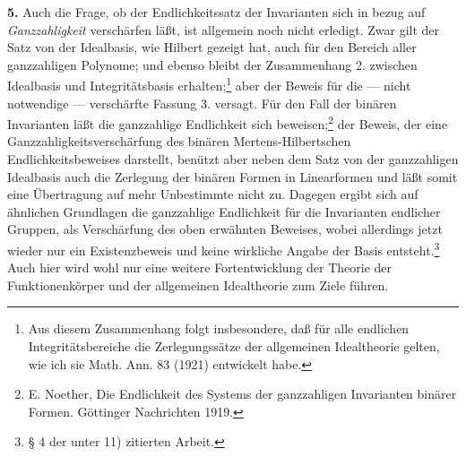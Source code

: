\documentclass[11pt]{article}
\begin{document}
\textbf{5.} Auch die Frage, ob der Endlichkeitssatz der Invarianten sich in bezug auf \emph{Ganzzahligkeit} verschärfen läßt, ist allgemein noch nicht erledigt. Zwar gilt der Satz von der Idealbasis, wie Hilbert gezeigt hat, auch für den Bereich aller ganzzahligen Polynome; und ebenso bleibt der Zusammenhang 2. zwischen Idealbasis und Integritätsbasis erhalten;\footnote{Aus diesem Zusammenhang folgt insbesondere, daß für alle endlichen Integritätsbereiche die Zerlegungssätze der allgemeinen Idealtheorie gelten, wie ich sie Math. Ann. 83 (1921) entwickelt habe.} aber der Beweis für die --- nicht notwendige --- verschärfte Fassung 3. versagt. Für den Fall der binären Invarianten läßt die ganzzahlige Endlichkeit sich beweisen;\footnote{E. Noether, Die Endlichkeit des Systems der ganzzahligen Invarianten binärer Formen. Göttinger Nachrichten 1919.} der Beweis, der eine Ganzzahligkeitsverschärfung des binären Mertens-Hilbertschen Endlichkeitsbeweises darstellt, benützt aber neben dem Satz von der ganzzahligen Idealbasis auch die Zerlegung der binären Formen in Linearformen und läßt somit eine Übertragung auf mehr Unbestimmte nicht zu. Dagegen ergibt sich auf ähnlichen Grundlagen die ganzzahlige Endlichkeit für die Invarianten endlicher Gruppen, als Verschärfung des oben erwähnten Beweises, wobei allerdings jetzt wieder nur ein Existenzbeweis und keine wirkliche Angabe der Basis entsteht.\footnote{§ 4 der unter 11) zitierten Arbeit.} Auch hier wird wohl nur eine weitere Fortentwicklung der Theorie der Funktionenkörper und der allgemeinen Idealtheorie zum Ziele führen.
\end{document}
